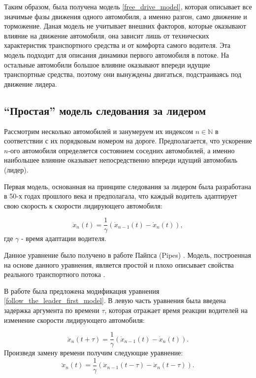 \documentclass[12pt, a4paper]{extarticle}
\numberwithin{equation}{section}
\numberwithin{figure}{section}
\begin{document}
Таким образом, была получена модель \eqref{free_drive_model}, которая описывает все значимые фазы движения одного автомобиля, а именно разгон, само движение и торможение. Даная модель не учитывает внешних факторов, которые оказывают влияние на движение автомобиля, она зависит лишь от технических характеристик транспортного средства и от комфорта самого водителя. Эта модель подходит для описания динамики первого автомобиля в потоке. На остальные автомобили большое влияние оказывают впереди идущие транспортные средства, поэтому они вынуждены двигаться, подстраиваясь под движение лидера.

\subsection{``Простая'' модель следования за лидером}

Рассмотрим несколько автомобилей и занумеруем их индексом $n \in \mathbb{N}$ в соответствии с их порядковым номером на дороге. Предполагается, что ускорение $n$-ого автомобиля определяется состоянием соседних автомобилей, а именно наибольшее влияние оказывает непосредственно впереди идущий автомобиль (лидер).

Первая модель, основанная на принципе следования за лидером была разработана в 50-х годах прошлого века и предполагала, что каждый водитель адаптирует свою скорость к скорости лидирующего автомобиля:

\begin{equation} \label{follow_the_leader_first_model}
\ddot{x}_n(t) = \dfrac{1}{\gamma} (\dot{x}_{n-1}(t) - \dot{x}_{n}(t)), 
\end{equation}
где $\gamma$ - время адаптации водителя.

Данное уравнение было получено в работе Пайпса (Pipes) \cite{FirstFollowTheLeaderModel}. Модель, построенная на основе данного уравнения, является простой и плохо описывает свойства реального транспортного потока \cite{Shvetsov}.

В работе \cite{RefineFirstFollowTheLeaderModel} была предложена модификация уравнения \eqref{follow_the_leader_first_model}. В левую часть уравнения была введена задержка аргумента по времени $\tau$, которая отражает время реакции водителей на изменение скорости лидирующего автомобиля:

\begin{equation*}
\ddot{x}_n(t+\tau) = \dfrac{1}{\gamma} (\dot{x}_{n-1}(t) - \dot{x}_{n}(t)).
\end{equation*}
Произведя замену времени получим следующие уравнение:
\begin{equation} \label{follow_the_leader_with_two_delay}
\ddot{x}_n(t) = \dfrac{1}{\gamma} (\dot{x}_{n-1}(t-\tau) - \dot{x}_{n}(t-\tau)).
\end{equation}
\end{document}

